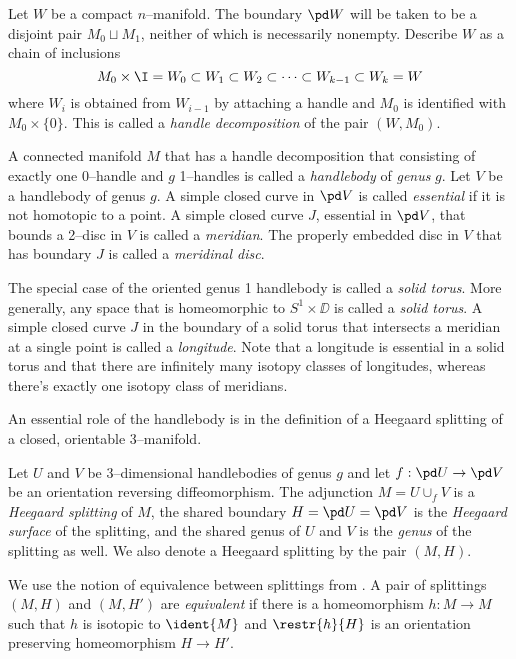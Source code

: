 \begin{defn}
	\label{def:morsehandle}
	Let $W$ be a compact $n$--manifold.
	The boundary $\pd W$ will be taken to be a disjoint pair $M_0\sqcup M_1$, neither of which is necessarily nonempty.
	Describe $W$ as a chain of inclusions
	\[
	M_0 \times\I = W_0 \subset W_1 \subset W_2 \subset \cdots \subset W_{k-1} \subset W_k = W
	\]
	where $W_i$ is obtained from $W_{i-1}$ by attaching a handle and $M_0$ is identified with $M_0\times \{0\}$.
	This is called a \emph{handle decomposition} of the pair $(W,M_0)$.
\end{defn}

\begin{defn}
	A connected manifold $M$ that has a handle decomposition that consisting of exactly one 0--handle and $g$ 1--handles is called a \emph{handlebody} of \emph{genus} $g$.
	Let $V$ be a handlebody of genus $g$.
	A simple closed curve in $\pd V$ is called \emph{essential} if it is not homotopic to a point.
	A simple closed curve $J$, essential in $\pd V$, that bounds a 2--disc in $V$ is called a \emph{meridian}.
	The properly embedded disc in $V$ that has boundary $J$ is called a \emph{meridinal disc}.
	
	The special case of the oriented genus 1 handlebody is called a \emph{solid torus}.
	More generally, any space that is homeomorphic to $S^1\times\DD$ is called a \emph{solid torus}.
	A simple closed curve $J$ in the boundary of a solid torus that intersects a meridian at a single point is called a \emph{longitude}.
	Note that a longitude is essential in a solid torus and that there are infinitely many isotopy classes of longitudes, whereas there's exactly one isotopy class of meridians.
\end{defn}

An essential role of the handlebody is in the definition of a Heegaard splitting of a closed, orientable 3--manifold.

\begin{defn}	
	Let $U$ and $V$ be 3--dimensional handlebodies of genus $g$ and let $f:\pd U\to \pd V$ be an orientation reversing diffeomorphism.
	The adjunction $M=U\cup_f V$ is a \emph{Heegaard splitting} of $M$, the shared boundary $H = \pd U = \pd V$ is the \emph{Heegaard surface} of the splitting, and the shared genus of $U$ and $V$ is the \emph{genus} of the splitting as well.
	We also denote a Heegaard splitting by the pair $(M,H)$.
	
	We use the notion of equivalence between splittings from \cite{SchlWald}.
	A pair of splittings $(M,H)$ and $(M,H')$ are \emph{equivalent} if there is a homeomorphism $h:M\to M$ such that $h$ is isotopic to $\ident{M}$ and $\restr{h}{H}$ is an orientation preserving homeomorphism $H\to H'$.
\end{defn}

